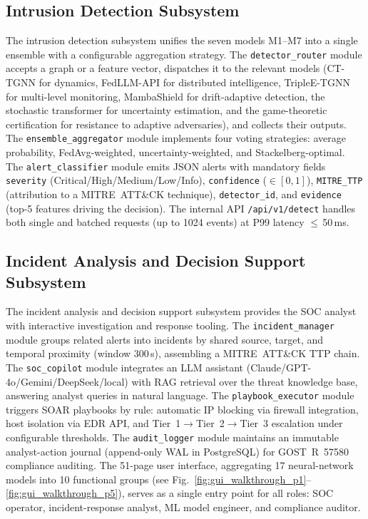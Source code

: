\subsection{Intrusion Detection Subsystem}
\label{subsec:func_detection}

The intrusion detection subsystem unifies the seven models M1--M7 into a single ensemble with a configurable aggregation strategy. The \texttt{detector\_router} module accepts a graph or a feature vector, dispatches it to the relevant models (CT-TGNN for dynamics, FedLLM-API for distributed intelligence, TripleE-TGNN for multi-level monitoring, MambaShield for drift-adaptive detection, the stochastic transformer for uncertainty estimation, and the game-theoretic certification for resistance to adaptive adversaries), and collects their outputs. The \texttt{ensemble\_aggregator} module implements four voting strategies: average probability, FedAvg-weighted, uncertainty-weighted, and Stackelberg-optimal. The \texttt{alert\_classifier} module emits JSON alerts with mandatory fields \texttt{severity} (Critical/High/Medium/Low/Info), \texttt{confidence} ($\in[0,1]$), \texttt{MITRE\_TTP} (attribution to a MITRE~ATT\&CK technique), \texttt{detector\_id}, and \texttt{evidence} (top-5 features driving the decision). The internal API \texttt{/api/v1/detect} handles both single and batched requests (up to 1024 events) at P99 latency $\leq$\,50\,ms.

\subsection{Incident Analysis and Decision Support Subsystem}
\label{subsec:func_incident}

The incident analysis and decision support subsystem provides the SOC analyst with interactive investigation and response tooling. The \texttt{incident\_manager} module groups related alerts into incidents by shared source, target, and temporal proximity (window 300\,s), assembling a MITRE~ATT\&CK TTP chain. The \texttt{soc\_copilot} module integrates an LLM assistant (Claude/GPT-4o/Gemini/DeepSeek/local) with RAG retrieval over the threat knowledge base, answering analyst queries in natural language. The \texttt{playbook\_executor} module triggers SOAR playbooks by rule: automatic IP blocking via firewall integration, host isolation via EDR API, and Tier~1$\to$Tier~2$\to$Tier~3 escalation under configurable thresholds. The \texttt{audit\_logger} module maintains an immutable analyst-action journal (append-only WAL in PostgreSQL) for GOST~R~57580 compliance auditing. The 51-page user interface, aggregating 17 neural-network models into 10 functional groups (see Fig.~\ref{fig:gui_walkthrough_p1}--\ref{fig:gui_walkthrough_p5}), serves as a single entry point for all roles: SOC operator, incident-response analyst, ML model engineer, and compliance auditor.

